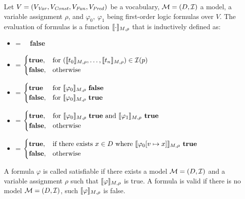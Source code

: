 \begin{mydef}
		Let $V = (V_{\mathit{Var}}, V_{\mathit{Const}}, V_{\mathit{Fun}}, V_{\mathit{Pred}})$ be a vocabulary, $\mathcal{M} = (D, \mathcal{I})$ a model, a variable assignment $\rho$, and $\varphi_0,\  \varphi_1$ being first-order logic formulas over $V$. The evaluation of formulas is a function $\llbracket \cdot \rrbracket_{M, \rho}$ that is inductively defined as: \\
		\begin{itemize}
			\item {\makebox[3.25cm]{$\eval{\bot} = \hfill$}} = \ \ \textbf{false}
			\item {} =
				$
				\begin{cases}
					\textbf{true}, & \text{for } (\llbracket t_0 \rrbracket_{M, \rho}, \ldots, \llbracket t_n \rrbracket_{M, \rho}) \in \mathcal{I}(p)\\
					\textbf{false}, & \text{otherwise}
				\end{cases}
				$
			\item {} =
				$
				\begin{cases}
					\textbf{true} & \text{for } \llbracket \varphi_0 \rrbracket_{M, \rho} \text{ \textbf{false}}\\
					\textbf{false}, & \text{for } \llbracket \varphi_0 \rrbracket_{M, \rho} \text{ \textbf{true}}\\
				\end{cases}
				$
			\item {} =
				$
				\begin{cases}
					\textbf{true}, & \text{for } \llbracket \varphi_0 \rrbracket_{M, \rho} \text{ \textbf{true} and } \llbracket \varphi_1 \rrbracket_{M, \rho} \textbf{ true} \\
					\textbf{false}, & \text{otherwise} \\
				\end{cases}
				$
			\item {} =
				$
				\begin{cases}
					\textbf{true}, & \text{if there exists } x \in D \text{ where } \llbracket \varphi_0 [v \mapsto x] \rrbracket_{M, \rho} \textbf{ true} \\
					\textbf{false}, & \text{otherwise} \\
				\end{cases}
				$
		\end{itemize}
\end{mydef}
A formula $\varphi$ is called satisfiable if there exists a model $\mathcal{M} = (D, \mathcal{I})$ and a variable assignment $\rho$ such that $\llbracket \varphi \rrbracket_{M, \rho}$ is true. A formula is valid if there is no model $\mathcal{M} = (D, \mathcal{I})$, such $\llbracket \varphi \rrbracket_{M, \rho}$ is false.
